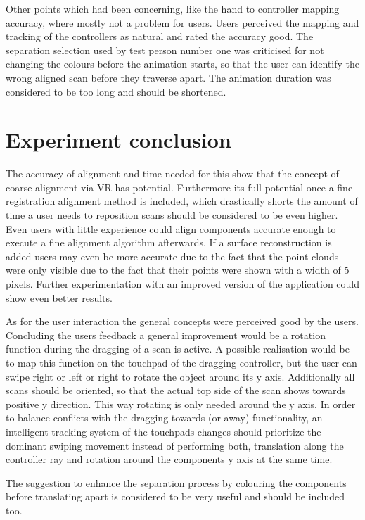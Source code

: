 \documentclass[hyperref,english,bachelorofscience,bibnum,twoside]{cgvpub}
\begin{document}
Other points which had been concerning, like the hand to controller mapping accuracy, where mostly not a problem for users. Users perceived the mapping and tracking of the controllers as natural and rated the accuracy good. The separation selection used by test person number one was criticised for not changing the colours before the animation starts, so that the user can identify the wrong aligned scan before they traverse apart. The animation duration was considered to be too long and should be shortened.

\section{Experiment conclusion}

The accuracy of alignment and time needed for this show that the concept of coarse alignment via VR has potential. Furthermore its full potential once a fine registration alignment method is included, which drastically shorts the amount of time a user needs to reposition scans   should be considered to be even higher. Even users with little experience could align components accurate enough to execute a fine alignment algorithm afterwards. If a surface reconstruction is added users may even be more accurate due to the fact that the point clouds were only visible due to the fact that their points were shown with a width of 5 pixels. Further experimentation with an improved version of the application could show even better results.

As for the user interaction the general concepts were perceived good by the users. Concluding the users feedback a general improvement would be a rotation function during the dragging of a scan is active. A possible realisation would be to map this function on the touchpad of the dragging controller, but the user can swipe right or left or right to rotate the object around its y axis. Additionally all scans should be oriented, so that the actual top side of the scan shows towards positive y direction. This way rotating is only needed around the y axis. In order to balance conflicts with the dragging towards (or away) functionality, an intelligent tracking system of the touchpads changes should prioritize the dominant swiping movement instead of performing both, translation along the controller ray and rotation around the components y axis at the same time.

The suggestion to enhance the separation process by colouring the components before translating apart is considered to be very useful and should be included too.
\end{document}
